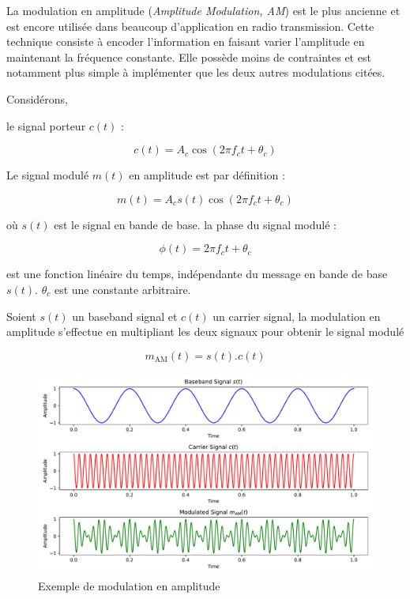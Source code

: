 La modulation en amplitude (\textit{Amplitude Modulation, AM}) est le plus ancienne et est encore utilisée dans beaucoup d'application en radio transmission. Cette technique consiste à encoder l'information en faisant varier l'amplitude en maintenant la fréquence constante. Elle possède moins de contraintes et est notamment plus simple à implémenter que les deux autres modulations citées. 

\vspace{0.1cm}

Considérons,

le signal porteur $c(t)$ :

\begin{equation}\label{eq112}
c(t) = A_c \cos(2 \pi f_c t + \theta_c)
\end{equation}

Le signal modulé $m(t)$ en amplitude est par définition :

\begin{equation}\label{eq112}
m(t) = A_c s(t) \cos(2 \pi f_c t + \theta_c)
\end{equation}

où $s(t)$ est le signal en bande de base. la phase du signal modulé :

\begin{equation}\label{eq113}
\phi (t) = 2 \pi f_c t + \theta_c 
\end{equation}

est une fonction linéaire du temps, indépendante du message en bande de base $s(t)$. $\theta_c$ est une constante arbitraire.

\vspace{0.1cm}

Soient $s(t)$ un baseband signal et $c(t)$ un carrier signal, la modulation en amplitude s'effectue en multipliant les deux signaux pour obtenir le signal modulé 

\begin{equation}\label{eq2}
m_\mathrm{AM}(t) = s(t) . c(t)
\end{equation}

\newpage

\begin{figure}[h]
\centering

\includegraphics[scale=0.5]{images/AM_MOD.pdf}
\caption{Exemple de modulation en amplitude}\label{term1}
\end{figure}

